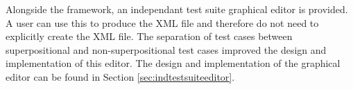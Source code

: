 

Alongside the framework, an independant test suite graphical editor is provided.
A user can use this to produce the XML file and therefore do not need to explicitly create the XML file.
The separation of test cases between superpositional and non-superpositional test cases improved the design and implementation of this editor.
The design and implementation of the graphical editor can be found in Section \ref{sec:indtestsuiteeditor}.

